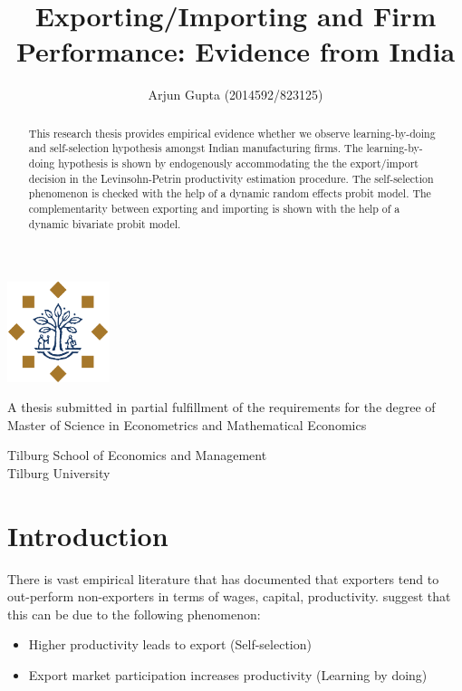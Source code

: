 \documentclass[11pt]{article}
\title{Exporting/Importing and Firm Performance: Evidence from India}
\author{Arjun Gupta (2014592/823125)}
\begin{document}
\maketitle

\begin{center}
\includegraphics[width=3cm]{./PICS/tilburg.png} 
\end{center}

\begin{abstract}
This research thesis provides empirical evidence whether we observe
learning-by-doing and  self-selection hypothesis amongst Indian
manufacturing firms. The learning-by-doing hypothesis is shown by
endogenously accommodating  the the export/import decision in the
Levinsohn-Petrin productivity estimation procedure. The self-selection phenomenon is
checked with the help of a dynamic random effects probit model. The
complementarity between exporting and importing is shown with the help
of a dynamic bivariate probit model. 
\end{abstract}
\bigskip

\begin{center}
A thesis submitted in partial fulfillment of the requirements for the
degree of Master of Science in Econometrics and Mathematical
Economics\\ 

\bigskip

Tilburg School of Economics and Management\\
Tilburg University
\end{center}
\newpage
\small

\tableofcontents

\newpage

\section{Introduction}\label{sec:introduction}



There is vast empirical literature  that has documented that exporters tend to
out-perform non-exporters  in terms of wages, capital,
productivity. \textcite{bernard1999exceptional}  suggest that this can be due
to the following phenomenon:
\begin{itemize}
\item  Higher productivity leads to  export (Self-selection)
\item Export market participation increases productivity (Learning by doing)
\end{itemize}
\end{document}

